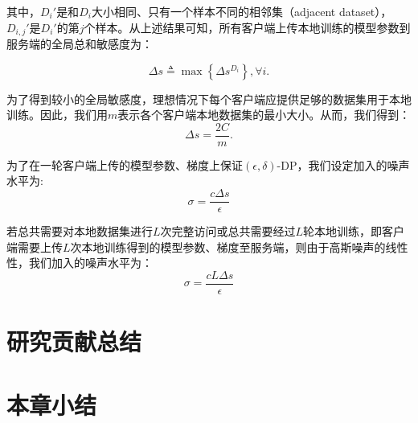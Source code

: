 其中，$D_i'$是和$D_i$大小相同、只有一个样本不同的相邻集（adjacent dataset），$D_{i,j}'$是$D_i'$的第$j$个样本。从上述结果可知，所有客户端上传本地训练的模型参数到服务端的全局总和敏感度为：

\begin{equation}
  \Delta s \triangleq \max\left\{\Delta s^{D_i}\right\}, \forall i.
\end{equation}

为了得到较小的全局敏感度，理想情况下每个客户端应提供足够的数据集用于本地训练。因此，我们用$m$表示各个客户端本地数据集的最小大小。从而，我们得到：
\begin{equation}
  \Delta s = \frac{2C}{m}.
\end{equation}

为了在一轮客户端上传的模型参数、梯度上保证$(\epsilon, \delta)$-DP，我们设定加入的噪声水平为:
\begin{equation}
  \sigma = \frac{c\Delta s}{\epsilon}
\end{equation}

若总共需要对本地数据集进行$L$次完整访问或总共需要经过$L$轮本地训练，即客户端需要上传$L$次本地训练得到的模型参数、梯度至服务端，则由于高斯噪声的线性性，我们加入的噪声水平为：
\begin{equation}
  \sigma = \frac{cL\Delta s}{\epsilon}
\end{equation}

\section{研究贡献总结}

\section{本章小结}
